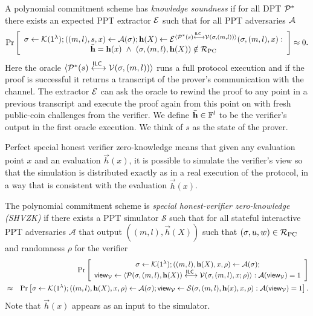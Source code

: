 \begin{definition}
A polynomial commitment scheme has \emph{knowledge soundness} if for all DPT $\mathcal{P}^*$ there exists an expected PPT extractor $\mathcal{E}$ such that for all PPT adversaries $\mathcal{A}$
$$\Pr\left[\begin{array}{c} \mathsf{\sigma}\gets \mathcal{K}(1^{\lambda});((m,l),s,x) \gets \mathcal{A}(\mathsf{\sigma}); \mathbf{h}(X) \gets \mathcal{E}^{\langle \mathcal{P}^*(s)\overset{\mathsf{ILC}~}{\longleftrightarrow}\mathcal{V}(\mathsf{\sigma},(m,l))\rangle}(\mathsf{\sigma},(m,l),x):\\ \bar{\mathbf{h}} = \mathbf{h}(x) ~\wedge~ (\mathsf{\sigma},(m,l),\mathbf{h}(X))\notin \mathcal{R}_\mathrm{PC} \end{array}\right]\approx 0.$$ 
Here the oracle $\langle \mathcal{P}^*(s)\overset{\mathsf{ILC}~}{\longleftrightarrow}\mathcal{V}(\mathsf{\sigma},(m,l))\rangle$ runs a full protocol execution and if the proof is successful it returns a transcript of the prover's communication with the channel. The extractor $\mathcal{E}$ can ask the oracle to rewind the proof to any point in a previous transcript and execute the proof again from this point on with fresh public-coin challenges from the verifier. We define $\bar{\mathbf{h}} \in \mathbb{F}^l$ to be the verifier's output in the first oracle execution. We think of $s$ as the state of the prover.
\end{definition}

Perfect special honest verifier zero-knowledge means that given any evaluation point $x$ and an evaluation $\vec{h}(x)$, it is possible to simulate the verifier's view so that the simulation is distributed exactly as in a real execution of the protocol, in a way that is consistent with the evaluation $\vec{h}(x)$.
\begin{definition}
The polynomial commitment scheme is \emph{special honest-verifier zero-knowledge (SHVZK)} if there exists a PPT simulator $\mathcal{S}$ such that for all stateful interactive PPT adversaries $\mathcal{A}$ that output $((m,l),\vec{h}(X))$ such that $(\mathsf{\sigma},u,w)\in \mathcal{R}_\mathrm{PC}$ and randomness $\rho$ for the verifier
\begin{eqnarray*}
&&\Pr \left[ \begin{array}{c}\mathsf{\sigma}\gets \mathcal{K}(1^{\lambda});((m,l), \mathbf{h}(X),x, \rho) \leftarrow\mathcal{A}(\mathsf{\sigma}); \\
\mathsf{view}_{\mathcal{V}}\leftarrow \langle \mathcal{P}(\mathsf{\sigma},(m,l),\mathbf{h}(X))\overset{\mathsf{ILC}~}{\longleftrightarrow} \mathcal{V}(\mathsf{\sigma},(m,l),x;\rho)\rangle: \mathcal{A}(\mathsf{view}_{\mathcal{V}})=1\end{array} \right]\\
&\approx
&\Pr \left[ \mathsf{\sigma}\gets \mathcal{K}(1^{\lambda});((m,l), \mathbf{h}(X),x, \rho) \leftarrow\mathcal{A}(\mathsf{\sigma}); \mathsf{view}_{\mathcal{V}}\leftarrow \mathcal{S}(\mathsf{\sigma},(m,l),\mathbf{h}(x),x,\rho): \mathcal{A}(\mathsf{view}_{\mathcal{V}})=1\right].
\end{eqnarray*}
Note that $\vec{h}(x)$ appears as an input to the simulator.
\end{definition}

